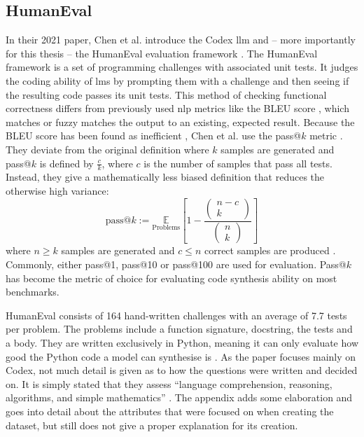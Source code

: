 \subsection{HumanEval}
\label{sec:humaneval}
In their 2021 paper, Chen et al. introduce the Codex \ac{llm} and -- more importantly for this thesis -- the HumanEval evaluation framework \cite{Chen.2021}.
The HumanEval framework is a set of programming challenges with associated unit tests.
It judges the coding ability of \acp{lm} by prompting them with a challenge and then seeing if the resulting code passes its unit tests.
This method of checking functional correctness differs from previously used \ac{nlp} metrics like the BLEU score \cite{Papineni.2001}, which matches or fuzzy matches the output to an existing, expected result.
Because the BLEU score has been found as inefficient \cite{Chen.2021,Luo.2024}, Chen et al. use the pass@$k$ metric \cite{Kulal.2019}.
They deviate from the original definition where $k$ samples are generated and pass@$k$ is defined by $\frac{c}{k}$, where $c$ is the number of samples that pass all tests.
Instead, they give a mathematically less biased definition that reduces the otherwise high variance:
\begin{equation}
    \text{pass@}k := \underset{\text{Problems}}{\mathbb{E}} \left[ 1 - \frac{ \left( \begin{array}{c} n-c \\ k \end{array} \right) }{ \left( \begin{array}{c} n \\ k \end{array} \right) } \right]
    \label{eq:passk}
\end{equation}
where $n \geq k$ samples are generated and $c \leq n$ correct samples are produced \cite{Chen.2021}.
Commonly, either pass@1, pass@10 or pass@100 are used for evaluation.
Pass@$k$ has become the metric of choice for evaluating code synthesis ability on most benchmarks.

HumanEval consists of 164 hand-written challenges with an average of 7.7 tests per problem.
The problems include a function signature, docstring, the tests and a body.
They are written exclusively in Python, meaning it can only evaluate how good the Python code a model can synthesise is \cite{Chen.2021}.
As the paper focuses mainly on Codex, not much detail is given as to how the questions were written and decided on. %
It is simply stated that they assess \enquote{language comprehension, reasoning, algorithms, and simple mathematics} \cite{Chen.2021}.
The appendix adds some elaboration and goes into detail about the attributes that were focused on when creating the dataset, but still does not give a proper explanation for its creation.

